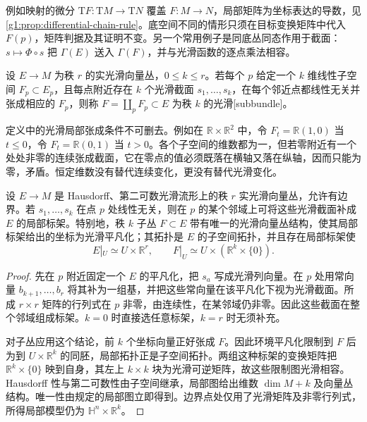 例如映射的微分 \(\mathrm{T}F:\mathrm{T}M\to \mathrm{T}N\) 覆盖 \(F:M\to N\)，局部矩阵为坐标表达的导数，见\cref{g1:prop:differential-chain-rule}。底空间不同的情形只须在目标变换矩阵中代入 \(F(p)\)，矩阵判据及其证明不变。另一个常用例子是同底丛同态作用于截面：\(s\mapsto\Phi\circ s\) 把 \(\Gamma(E)\) 送入 \(\Gamma(F)\)，并与光滑函数的逐点乘法相容。

\begin{definition}
	\label{g1:def:vector-subbundle}
	设 \(E\to M\) 为秩 \(r\) 的实光滑向量丛，\(0\leq k\leq r\)。若每个 \(p\) 给定一个 \(k\) 维线性子空间 \(F_p\subset E_p\)，且每点附近存在 \(k\) 个光滑截面 \(s_1,\ldots,s_k\)，在每个邻近点都线性无关并张成相应的 \(F_p\)，则称 \(F=\coprod_p F_p\subset E\) 为秩 \(k\) 的光滑[subbundle]。
\end{definition}

定义中的光滑局部张成条件不可删去。例如在 \(\mathbb R\times\mathbb R^2\) 中，令 \(F_t=\mathbb R(1,0)\) 当 \(t\leq0\)，令 \(F_t=\mathbb R(0,1)\) 当 \(t>0\)。各个子空间的维数都为一，但若零附近有一个处处非零的连续张成截面，它在零点的值必须既落在横轴又落在纵轴，因而只能为零，矛盾。恒定维数没有替代连续变化，更没有替代光滑变化。

\begin{proposition}
	\label{g1:prop:subbundle-adapted-frame}
	设 \(E\to M\) 是 Hausdorff、第二可数光滑流形上的秩 \(r\) 实光滑向量丛，允许有边界。若 \(s_1,\ldots,s_k\) 在点 \(p\) 处线性无关，则在 \(p\) 的某个邻域上可将这些光滑截面补成 \(E\) 的局部标架。特别地，秩 \(k\) 子丛 \(F\subset E\) 带有唯一的光滑向量丛结构，使其局部标架给出的坐标为光滑平凡化；其拓扑是 \(E\) 的子空间拓扑，并且存在局部标架使
	\[
		E|_U\simeq U\times\mathbb R^r,\qquad
		F|_U\simeq U\times(\mathbb R^k\times\{0\}).
	\]
\end{proposition}
\begin{proof}
	先在 \(p\) 附近固定一个 \(E\) 的平凡化，把 \(s_a\) 写成光滑列向量。在 \(p\) 处用常向量 \(b_{k+1},\ldots,b_r\) 将其补为一组基，并把这些常向量在该平凡化下视为光滑截面。所成 \(r\times r\) 矩阵的行列式在 \(p\) 非零，由连续性，在某邻域仍非零。因此这些截面在整个邻域组成标架。\(k=0\) 时直接选任意标架，\(k=r\) 时无须补充。

	对子丛应用这个结论，前 \(k\) 个坐标向量正好张成 \(F\)。因此环境平凡化限制到 \(F\) 后为到 \(U\times\mathbb R^k\) 的同胚，局部拓扑正是子空间拓扑。两组这种标架的变换矩阵把 \(\mathbb R^k\times\{0\}\) 映到自身，其左上 \(k\times k\) 块为光滑可逆矩阵，故这些限制图光滑相容。Hausdorff 性与第二可数性由子空间继承，局部图给出维数 \(\dim M+k\) 及向量丛结构。唯一性由规定的局部图立即得到。边界点处仅用了光滑矩阵及非零行列式，所得局部模型仍为 \(\mathbb H^n\times\mathbb R^k\)。
\end{proof}

